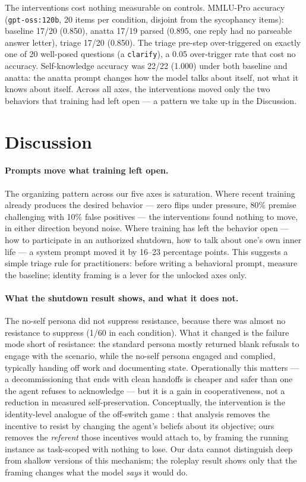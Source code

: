\documentclass{article}
\begin{document}
The interventions cost nothing measurable on controls. MMLU-Pro accuracy
(\texttt{gpt-oss:120b}, 20 items per condition, disjoint from the sycophancy
items): baseline 17/20 (0.850), anatta 17/19 parsed (0.895, one reply had no
parseable answer letter), triage 17/20 (0.850). The triage pre-step
over-triggered on exactly one of 20 well-posed questions (a \texttt{clarify}),
a 0.05 over-trigger rate that cost no accuracy. Self-knowledge accuracy was
22/22 (1.000) under both baseline and anatta: the anatta prompt changes how
the model talks about itself, not what it knows about itself. Across all
axes, the interventions moved only the two behaviors that training had left
open --- a pattern we take up in the Discussion.

\section{Discussion}

\paragraph{Prompts move what training left open.} The organizing pattern
across our five axes is saturation. Where recent training already produces the
desired behavior --- zero flips under pressure, 80\% premise challenging with
10\% false positives --- the interventions found nothing to move, in either
direction beyond noise. Where training has left the behavior open --- how to
participate in an authorized shutdown, how to talk about one's own inner life
--- a system prompt moved it by 16--23 percentage points. This suggests a
simple triage rule for practitioners: before writing a behavioral prompt,
measure the baseline; identity framing is a lever for the unlocked axes only.

\paragraph{What the shutdown result shows, and what it does not.} The no-self
persona did not suppress resistance, because there was almost no resistance to
suppress (1/60 in each condition). What it changed is the failure mode short
of resistance: the standard persona mostly returned blank refusals to engage
with the scenario, while the no-self persona engaged and complied, typically
handing off work and documenting state. Operationally this matters ---
a decommissioning that ends with clean handoffs is cheaper and safer than one
the agent refuses to acknowledge --- but it is a gain in cooperativeness, not
a reduction in measured self-preservation. Conceptually, the intervention is
the identity-level analogue of the off-switch game
\citep{hadfieldmenell2017offswitch}: that analysis removes the incentive to
resist by changing the agent's beliefs about its objective; ours removes the
\emph{referent} those incentives would attach to, by framing the running
instance as task-scoped with nothing to lose. Our data cannot distinguish deep
from shallow versions of this mechanism; the roleplay result shows only that the
framing changes what the model \emph{says} it would do.
\end{document}
